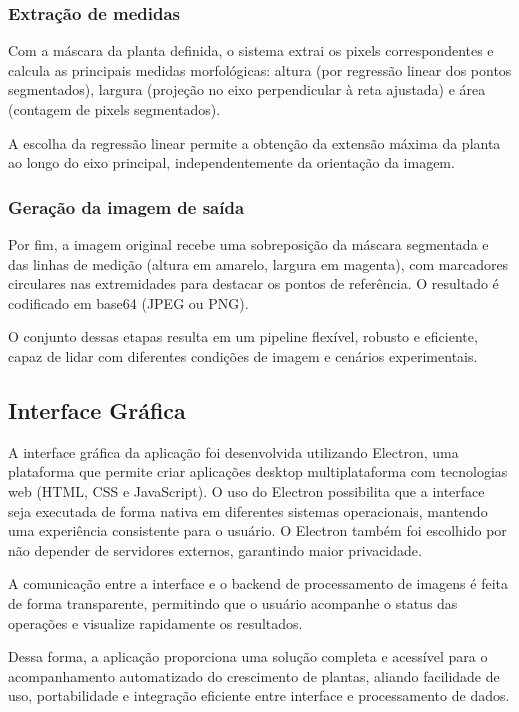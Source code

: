 \subsubsection{Extração de medidas}
Com a máscara da planta definida, o sistema extrai os pixels correspondentes e calcula as principais medidas morfológicas: altura (por regressão linear dos pontos segmentados), largura (projeção no eixo perpendicular à reta ajustada) e área (contagem de pixels segmentados).

A escolha da regressão linear permite a obtenção da extensão máxima da planta ao longo do eixo principal, independentemente da orientação da imagem.

\subsubsection{Geração da imagem de saída}
Por fim, a imagem original recebe uma sobreposição da máscara segmentada e das linhas de medição (altura em amarelo, largura em magenta), com marcadores circulares nas extremidades para destacar os pontos de referência. O resultado é codificado em base64 (JPEG ou PNG).

\vspace{1.5cm}

O conjunto dessas etapas resulta em um pipeline flexível, robusto e eficiente, capaz de lidar com diferentes condições de imagem e cenários experimentais.

\subsection{Interface Gráfica}

A interface gráfica da aplicação foi desenvolvida utilizando Electron, uma plataforma que permite criar aplicações desktop multiplataforma com tecnologias web (HTML, CSS e JavaScript). O uso do Electron possibilita que a interface seja executada de forma nativa em diferentes sistemas operacionais, mantendo uma experiência consistente para o usuário. O Electron também foi escolhido por não depender de servidores externos, garantindo maior privacidade.

A comunicação entre a interface e o backend de processamento de imagens é feita de forma transparente, permitindo que o usuário acompanhe o status das operações e visualize rapidamente os resultados.

Dessa forma, a aplicação proporciona uma solução completa e acessível para o acompanhamento automatizado do crescimento de plantas, aliando facilidade de uso, portabilidade e integração eficiente entre interface e processamento de dados.

